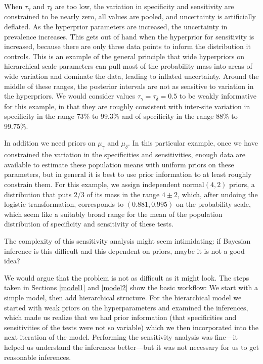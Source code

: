 \documentclass[11pt]{article}
\begin{document}
When $\tau_{\gamma}$ and $\tau_{\delta}$ are too low, the variation in specificity and sensitivity are constrained to be nearly zero, all values are pooled, and
uncertainty is artificially deflated. As the hyperprior parameters are increased,
the uncertainty in prevalence increases. This gets out of hand when
the hyperprior for sensitivity is increased, because there are only
three data points to inform the distribution it controls. This is an example of the general principle that
wide hyperpriors on hierarchical scale parameters can pull most of the probability mass into areas of wide
variation and dominate the data, leading to inflated uncertainty.
Around the middle of these ranges, the posterior intervals
are not as sensitive to variation in the hyperpriors. We would consider values $\tau_{\gamma}=\tau_{\delta}=0.5$ to be weakly informative for this example, in that they are roughly consistent with inter-site
variation in specificity in the range 73\% to 99.3\% and of specificity
in the range 88\% to 99.75\%. 

In addition we need priors on $\mu_{\gamma}$ and $\mu_{\delta}$.  In this particular example, once we have constrained the variation in the specificities and sensitivities, enough data are available to estimate these population means with uniform priors on these parameters, but in general it is best to use prior information to at least roughly constrain them.
For this example, we assign independent $\mbox{normal}(4,2)$ priors, a distribution that puts 2/3 of its mass in the range $4\pm 2$, which, after undoing the logistic transformation, corresponds to $(0.881, 0.995)$ on the probability scale, which seem like a suitably broad range for the mean of the population distribution of specificity and sensitivity of these tests. 

The complexity of this sensitivity analysis might seem intimidating:  if Bayesian inference is this difficult and this dependent on priors, maybe it is not a good idea?

We would argue that the problem is not as difficult as it might look.  The steps taken in Sections \ref{model1} and \ref{model2} show the basic workflow:  We start with a simple model, then add hierarchical structure.  For the hierarchical model we started with weak priors on the hyperparameters and examined the inferences, which made us realize that we had prior information (that specificities and sensitivities of the tests were not so variable) which we then incorporated into the next iteration of the model.  Performing the sensitivity analysis was fine---it helped us understand the inferences better---but it was not necessary for us to get reasonable inferences.
\end{document}
